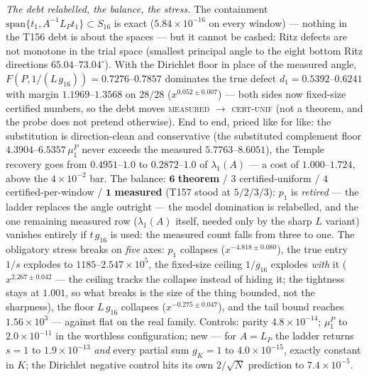 \documentclass[11pt,a4paper]{article}
\begin{document}
\emph{The debt relabelled, the balance, the stress.} The containment
$\mathrm{span}\{t_1,A^{-1}L_Pt_1\}\subset S_{16}$ is exact ($5.84\times10^{-16}$ on
every window) --- nothing in the T156 debt is about the spaces --- but it cannot be
cashed: Ritz defects are not monotone in the trial space (smallest principal angle to
the eight bottom Ritz directions $65.04$--$73.04^\circ$). With the Dirichlet floor in
place of the measured angle, $F(P,1/(L\,g_{16}))=0.7276$--$0.7857$ dominates the true
defect $d_1=0.5392$--$0.6241$ with margin $1.1969$--$1.3568$ on $28/28$
($x^{0.052\pm0.007}$) --- both sides now fixed-size certified numbers, so the debt
moves \textsc{measured} $\to$ \textsc{cert-unif} (not a theorem, and the probe does not
pretend otherwise). End to end, priced like for like: the substitution is
direction-clean and conservative (the substituted complement floor
$4.3904$--$6.5357\,\mu^P_1$ never exceeds the measured $5.7763$--$8.6051$), the Temple
recovery goes from $0.4951$--$1.0$ to $0.2872$--$1.0$ of $\lambda_1(A)$ --- a cost of
$1.000$--$1.724$, above the $4\times10^{-2}$ bar. The balance: $\mathbf 6$
\textbf{theorem} / $3$ certified-uniform / $4$ certified-per-window / $\mathbf 1$
\textbf{measured} (T157 stood at $5/2/3/3$): $p_1$ is \emph{retired} --- the ladder
replaces the angle outright --- the model domination is relabelled, and the one
remaining measured row ($\lambda_1(A)$ itself, needed only by the sharp $L$ variant)
vanishes entirely if $t\,g_{16}$ is used: the measured count falls from three to one.
The obligatory stress breaks on \emph{five} axes: $p_1$ collapses
($x^{-4.818\pm0.080}$), the true entry $1/s$ explodes to $1185$--$2.547\times10^{5}$,
the fixed-size ceiling $1/g_{16}$ explodes \emph{with} it ($x^{2.267\pm0.042}$ --- the
ceiling tracks the collapse instead of hiding it; the tightness stays at $1.001$, so
what breaks is the size of the thing bounded, not the sharpness), the floor
$L\,g_{16}$ collapses ($x^{-0.275\pm0.047}$), and the tail bound reaches
$1.56\times10^{3}$ --- against flat on the real family. Controls: parity
$4.8\times10^{-14}$; $\mu^P_1$ to $2.0\times10^{-11}$ in the worthless configuration;
new --- for $A=L_P$ the ladder returns $s=1$ to $1.9\times10^{-13}$ \emph{and} every
partial sum $g_K=1$ to $4.0\times10^{-15}$, exactly constant in $K$; the Dirichlet
negative control hits its own $2/\sqrt N$ prediction to $7.4\times10^{-5}$.
\end{document}
